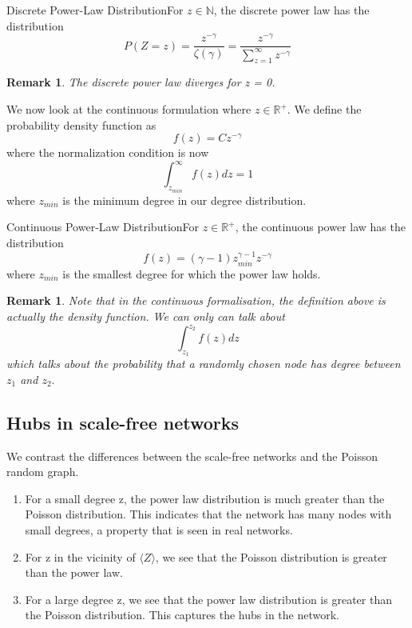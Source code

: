 \documentclass[twoside]{article}
\newtheorem{remark}[theorem]{Remark}
\begin{document}
\begin{definition_exam}{Discrete Power-Law Distribution}{}For $z \in \mathbb{N}$, the discrete power law has the distribution 
$$
P(Z=z) = \frac{z^{-\gamma}}{\zeta(\gamma)} = \frac{z^{-\gamma}}{\sum_{z=1}^{\infty}z^{-\gamma}}
$$
\end{definition_exam}

\begin{remark}The discrete power law diverges for z = 0.
\end{remark}

We now look at the continuous formulation where $z \in \mathbb{R}^+.$ We define the probability density function as
$$
f(z) = Cz^{-\gamma}
$$
where the normalization condition is now 
$$
\int_{z_{min}}^{\infty}f(z)dz = 1
$$
where $z_{min}$ is the minimum degree in our degree distribution.

\begin{definition_exam}{Continuous Power-Law Distribution}{}For $z \in \mathbb{R}^+$, the continuous power law has the distribution 
$$
f(z) = (\gamma - 1)z_{min}^{\gamma - 1}z^{-\gamma}
$$
where $z_{min}$ is the smallest degree for which the power law holds.
\end{definition_exam}

\begin{remark}
Note that in the continuous formalisation, the definition above is actually the density function. We can only can talk about 
$$
\int_{z_{1}}^{z_{2}}f(z)dz
$$
which talks about the probability that a randomly chosen node has degree between $z_1$ and $z_2.$
\end{remark}

\subsection{Hubs in scale-free networks}
We contrast the differences between the scale-free networks and the Poisson random graph.
\begin{enumerate}
\item For a small degree z, the power law distribution is much greater than the Poisson distribution. This indicates that the network has many nodes with small degrees, a property that is seen in real networks.
\item For z in the vicinity of $\langle Z \rangle$, we see that the Poisson distribution is greater than the power law.
\item For a large degree z, we see that the power law distribution is greater than the Poisson distribution. This captures the hubs in the network.
\end{enumerate}
\end{document}
